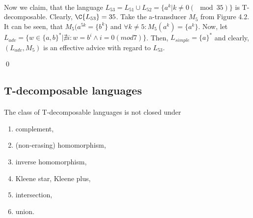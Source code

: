 \begin{enumerate}
\paragraph{}
Now we claim, that the language $L_{53} = L_{51} \cup L_{52} = \{a^k|k\neq 0 (\mod 35)\}$ is T-decomposable. Clearly, $\C{L_{53}} = 35$. Take the a-transducer $M_5$ from Figure 4.2. It can be seen, that $M_5(a^{5k} = \{ b^k \}$ and $\forall k \neq 5: M_5(a^k) = \{ a^k \}$. Now, let $L_{adv} = \{ w \in \{a,b\}^* | \nexists i: w = b^i \wedge i = 0 (mod 7) \}$. Then, $L_{simple} = \{a\}^*$ and clearly, $(L_{adv},M_5)$ is an effective advice with regard to $L_{53}$.

\end{enumerate} \qed

\subsection{T-decomposable languages}

\paragraph{}
\cveta The class of T-decomposable languages is not closed under 
\begin{enumerate}
\item complement,
\item (non-erasing) homomorphism,
\item inverse homomorphism,
\item Kleene star, Kleene plus,
\item intersection,
\item union.
\end{enumerate}

